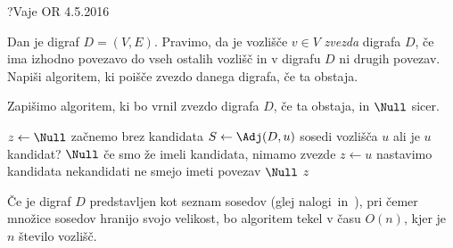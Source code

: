 \begin{naloga}{?}{Vaje OR 4.5.2016}
\begin{vprasanje}
Dan je digraf $D = (V, E)$.
Pravimo, da je vozlišče $v \in V$ {\em zvezda} digrafa $D$,
če ima izhodno povezavo do vseh ostalih vozlišč
in v digrafu $D$ ni drugih povezav.
Napiši algoritem, ki poišče zvezdo danega digrafa, če ta obstaja.
\end{vprasanje}

\begin{odgovor}
Zapišimo algoritem, ki bo vrnil zvezdo digrafa $D$, če ta obstaja,
in $\Null$ sicer.
\begin{small}
\begin{algorithmic}
    \State $z \gets \Null$ \hfill začnemo brez kandidata
        \State $S \gets \Adj(D, u)$ \hfill sosedi vozlišča $u$
         \hfill ali je $u$ kandidat?
                \State \Return $\Null$
                    \hfill če smo že imeli kandidata, nimamo zvezde
            \EndIf
            \State $z \gets u$ \hfill nastavimo kandidata
         \hfill nekandidati ne smejo imeti povezav
            \State \Return $\Null$
        \EndIf
    \EndFor
    \State \Return $z$
\EndFunction
\end{algorithmic}
\end{small}
Če je digraf $D$ predstavljen kot seznam sosedov
(glej nalogi~\res[sosgraf] in~\res[digraf]),
pri čemer množice sosedov hranijo svojo velikost,
bo algoritem tekel v času $O(n)$, kjer je $n$ število vozlišč.
\end{odgovor}
\end{naloga}
